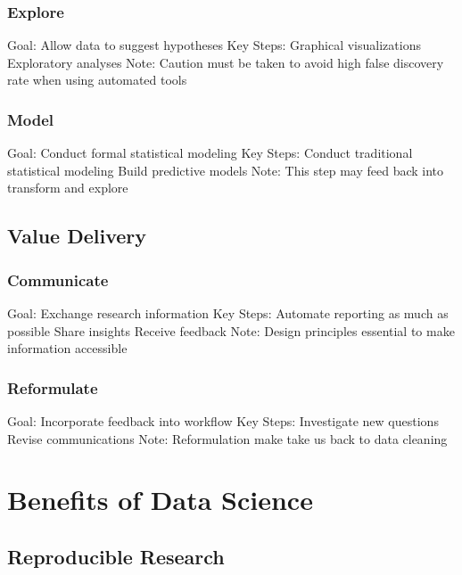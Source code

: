 \documentclass[
]{book}
\begin{document}
\hypertarget{explore}{%
\subsubsection{Explore}\label{explore}}

Goal:
Allow data to suggest hypotheses
Key Steps:
Graphical visualizations
Exploratory analyses
Note:
Caution must be taken to avoid high false discovery rate when using automated tools

\hypertarget{model}{%
\subsubsection{Model}\label{model}}

Goal:
Conduct formal statistical modeling
Key Steps:
Conduct traditional statistical modeling
Build predictive models
Note:
This step may feed back into transform and explore

\hypertarget{value-delivery}{%
\subsection{Value Delivery}\label{value-delivery}}

\hypertarget{communicate}{%
\subsubsection{Communicate}\label{communicate}}

Goal:
Exchange research information
Key Steps:
Automate reporting as much as possible
Share insights
Receive feedback
Note:
Design principles essential to make information accessible

\hypertarget{reformulate}{%
\subsubsection{Reformulate}\label{reformulate}}

Goal:
Incorporate feedback into workflow
Key Steps:
Investigate new questions
Revise communications
Note:
Reformulation make take us back to data cleaning

\hypertarget{benefits-of-data-science}{%
\section{Benefits of Data Science}\label{benefits-of-data-science}}

\hypertarget{reproducible-research}{%
\subsection{Reproducible Research}\label{reproducible-research}}
\end{document}
